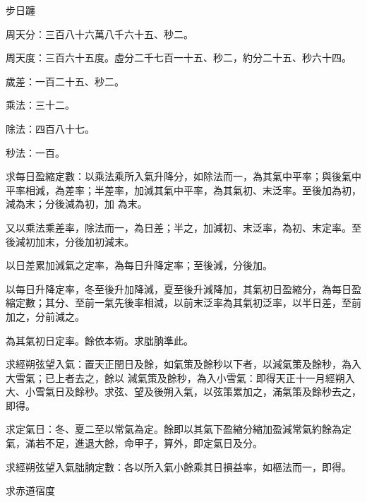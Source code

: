 
\begin{pinyinscope}

 步日躔



 周天分：三百八十六萬八千六十五、秒二。



 周天度：三百六十五度。虛分二千七百一十五、秒二，約分二十五、秒六十四。



 歲差：一百二十五、秒二。



 乘法：三十二。



 除法：四百八十七。



 秒法：一百。



 求每日盈縮定數：以乘法乘所入氣升降分，如除法而一，為其氣中平率；與後氣中平率相減，為差率；半差率，加減其氣中平率，為其氣初、末泛率。至後加為初，減為末；分後減為初，加
 為末。



 又以乘法乘差率，除法而一，為日差；半之，加減初、末泛率，為初、末定率。至後減初加末，分後加初減末。



 以日差累加減氣之定率，為每日升降定率；至後減，分後加。



 以每日升降定率，冬至後升加降減，夏至後升減降加，其氣初日盈縮分，為每日盈縮定數；其分、至前一氣先後率相減，以前末泛率為其氣初泛率，以半日差，至前加之，分前減之。



 為其氣初日定率。餘依本術。求朏朒準此。



 求經朔弦望入氣：置天正閏日及餘，如氣策及餘秒以下者，以減氣策及餘秒，為入大雪氣；已上者去之，餘以
 減氣策及餘秒，為入小雪氣：即得天正十一月經朔入大、小雪氣日及餘秒。求弦、望及後朔入氣，以弦策累加之，滿氣策及餘秒去之，即得。



 求定氣日：冬、夏二至以常氣為定。餘即以其氣下盈縮分縮加盈減常氣約餘為定氣，滿若不足，進退大餘，命甲子，算外，即定氣日及分。



 求經朔弦望入氣朏朒定數：各以所入氣小餘乘其日損益率，如樞法而一，即得。



 求赤道宿度




\end{pinyinscope}
